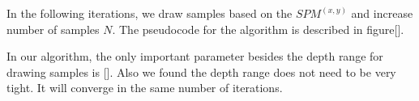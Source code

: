 In the following iterations, we draw samples based on the $SPM^{(x,y)}$ and increase number of samples $N$. The pseudocode for the algorithm is described in figure[].

In our algorithm, the only important parameter besides the depth range for drawing samples is [].
Also we found the depth range does not need to be very tight. It will converge in the same number of iterations.





